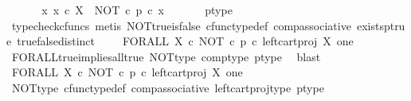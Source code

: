 \begin{isabellebody}
\ \isamarkupfalse%
\ \isamarkupfalse%
\ {\isachardoublequoteopen}{\isasymnot}\ {\isacharparenleft}{\kern0pt}{\isasymforall}\ x{\isachardot}{\kern0pt}\ x\ {\isasymin}\isactrlsub c\ X\ {\isasymlongrightarrow}\ {\isacharparenleft}{\kern0pt}NOT\ {\isasymcirc}\isactrlsub c\ p{\isacharparenright}{\kern0pt}\ {\isasymcirc}\isactrlsub c\ x\ {\isacharequal}{\kern0pt}\ {\isasymt}{\isacharparenright}{\kern0pt}{\isachardoublequoteclose}\isanewline
\ \ \ \isamarkupfalse%
\ p{\isacharunderscore}{\kern0pt}type\ \isamarkupfalse%
\ {\isacharparenleft}{\kern0pt}typecheck{\isacharunderscore}{\kern0pt}cfuncs{\isacharcomma}{\kern0pt}\ metis\ NOT{\isacharunderscore}{\kern0pt}true{\isacharunderscore}{\kern0pt}is{\isacharunderscore}{\kern0pt}false\ cfunc{\isacharunderscore}{\kern0pt}type{\isacharunderscore}{\kern0pt}def\ comp{\isacharunderscore}{\kern0pt}associative\ exists{\isacharunderscore}{\kern0pt}p{\isacharunderscore}{\kern0pt}true\ true{\isacharunderscore}{\kern0pt}false{\isacharunderscore}{\kern0pt}distinct{\isacharparenright}{\kern0pt}\isanewline
\ \isamarkupfalse%
\ \isamarkupfalse%
\ {\isachardoublequoteopen}FORALL\ X\ {\isasymcirc}\isactrlsub c\ {\isacharparenleft}{\kern0pt}{\isacharparenleft}{\kern0pt}NOT\ {\isasymcirc}\isactrlsub c\ p{\isacharparenright}{\kern0pt}\ {\isasymcirc}\isactrlsub c\ left{\isacharunderscore}{\kern0pt}cart{\isacharunderscore}{\kern0pt}proj\ X\ one{\isacharparenright}{\kern0pt}\isactrlsup {\isasymsharp}\ {\isasymnoteq}\ {\isasymt}{\isachardoublequoteclose}\isanewline
\ \ \ \isamarkupfalse%
\ FORALL{\isacharunderscore}{\kern0pt}true{\isacharunderscore}{\kern0pt}implies{\isacharunderscore}{\kern0pt}all{\isacharunderscore}{\kern0pt}true\ NOT{\isacharunderscore}{\kern0pt}type\ comp{\isacharunderscore}{\kern0pt}type\ p{\isacharunderscore}{\kern0pt}type\ \isamarkupfalse%
\ blast\isanewline
\ \isamarkupfalse%
\ \isamarkupfalse%
\ {\isachardoublequoteopen}FORALL\ X\ {\isasymcirc}\isactrlsub c\ {\isacharparenleft}{\kern0pt}NOT\ {\isasymcirc}\isactrlsub c\ p\ {\isasymcirc}\isactrlsub c\ left{\isacharunderscore}{\kern0pt}cart{\isacharunderscore}{\kern0pt}proj\ X\ one{\isacharparenright}{\kern0pt}\isactrlsup {\isasymsharp}\ {\isasymnoteq}\ {\isasymt}{\isachardoublequoteclose}\isanewline
\ \ \ \isamarkupfalse%
\ NOT{\isacharunderscore}{\kern0pt}type\ cfunc{\isacharunderscore}{\kern0pt}type{\isacharunderscore}{\kern0pt}def\ comp{\isacharunderscore}{\kern0pt}associative\ left{\isacharunderscore}{\kern0pt}cart{\isacharunderscore}{\kern0pt}proj{\isacharunderscore}{\kern0pt}type\ p{\isacharunderscore}{\kern0pt}type\ \isamarkupfalse%

\end{isabellebody}
